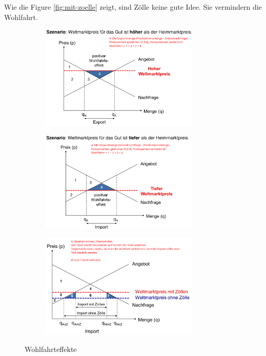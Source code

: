 \documentclass[11pt,twoside,landscape]{article}
\begin{document}
\begin{multicols}{3}
Wie die Figure \ref{fig:mit-zoelle} zeigt, sind Zölle keine gute Idee.
Sie vermindern die Wohlfahrt.
\begin{figure}[H]
  \centering
  \begin{subfigure}{0.4\textwidth}
    \centering
    \includegraphics[width=3in]{img/wohlfahrt_hoher_welkmakrspreis.png}
  \end{subfigure}
  \hfill
  \begin{subfigure}{0.4\textwidth}
    \centering
    \includegraphics[width=3in]{img/wohlfahrt_tiefer_weltmarktpreis.png}
  \end{subfigure}
  \vfill
  \begin{subfigure}{0.4\textwidth}
    \centering
    \includegraphics[width=3in]{img/wohlfahrt_zoelle.png}
  \end{subfigure}
  \caption{
    \label{fig:wohlfahrt-effekte}
    Wohlfahrteffekte
  }
\end{figure}


\end{multicols}
\end{document}
